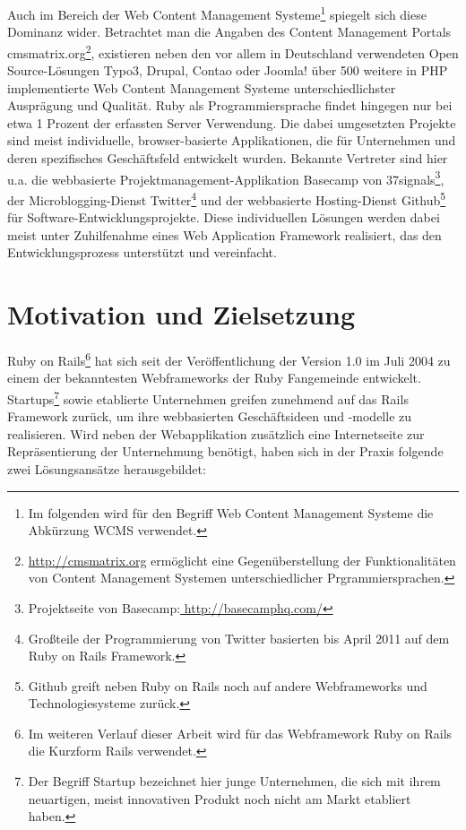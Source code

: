Auch im Bereich der Web Content Management Systeme\footnote{Im folgenden wird für den Begriff Web Content Management Systeme die Abkürzung WCMS verwendet.} spiegelt sich diese Dominanz wider. Betrachtet man die Angaben des Content Management Portals cmsmatrix.org\footnote{\href{http://cmsmatrix.org}{http://cmsmatrix.org} ermöglicht eine Gegenüberstellung der Funktionalitäten von Content Management Systemen unterschiedlicher Prgrammiersprachen.}, existieren neben den vor allem in Deutschland verwendeten Open Source-Lösungen Typo3, Drupal, Contao oder Joomla! über 500 weitere in PHP implementierte Web Content Management Systeme unterschiedlichster Ausprägung und Qualität.
Ruby als Programmiersprache findet hingegen nur bei etwa 1 Prozent der erfassten Server Verwendung. Die dabei umgesetzten Projekte sind meist individuelle, browser-basierte Applikationen, die für Unternehmen und deren spezifisches Geschäftsfeld entwickelt wurden. Bekannte Vertreter sind hier u.a. die webbasierte Projektmanagement-Applikation Basecamp von 37signals\footnote{Projektseite von Basecamp:\href{http://basecamphq.com}{ http://basecamphq.com/}}, der Microblogging-Dienst Twitter\footnote{
Großteile der Programmierung von Twitter basierten bis April 2011 auf dem Ruby on Rails Framework.} und der webbasierte Hosting-Dienst Github\footnote{Github greift neben Ruby on Rails noch auf andere Webframeworks und Technologiesysteme zurück.
} für Software-Entwicklungsprojekte.
Diese individuellen Lösungen werden dabei meist unter Zuhilfenahme  eines Web Application Framework realisiert, das den Entwicklungsprozess unterstützt und vereinfacht.



\section{Motivation und Zielsetzung}

Ruby on Rails\footnote{Im weiteren Verlauf dieser Arbeit wird für das Webframework Ruby on Rails die Kurzform Rails verwendet.} hat sich seit der Veröffentlichung der Version 1.0 im Juli 2004 zu einem der bekanntesten Webframeworks der Ruby Fangemeinde entwickelt.
Startups\footnote{Der Begriff Startup bezeichnet hier junge Unternehmen, die sich mit ihrem neuartigen, meist innovativen Produkt noch nicht am Markt etabliert haben.} sowie etablierte Unternehmen greifen zunehmend auf das Rails Framework zurück, um ihre webbasierten Geschäftsideen und -modelle zu realisieren.
Wird neben der Webapplikation zusätzlich eine Internetseite zur Repräsentierung der Unternehmung benötigt, haben sich in der Praxis folgende zwei Lösungsansätze herausgebildet:

